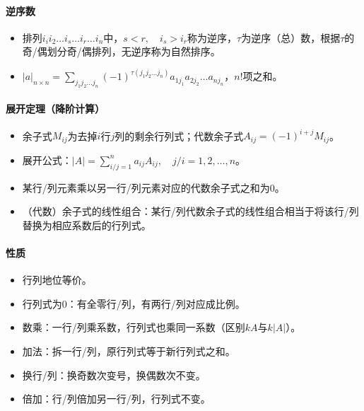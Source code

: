 \documentclass[
12pt, %
a4paper, 
oneside, %
]{scrartcl}
\begin{document}
\paragraph{逆序数}
\begin{itemize}
\item 排列$ i_i i_2 \dots i_s \dots i_r \dots i_n $中，$ s < r, \quad i_s > i_r $称为逆序，$ \tau $为逆序（总）数，根据$ \tau $的奇/偶划分奇/偶排列，无逆序称为自然排序。
\item $ |a|_{n \times n} = \sum_{j_1 j_2 \dots j_n}(-1)^{\tau(j_1 j_2 \dots j_n)} a_{1 j_{1}} a_{2 j_{2}} \dots a_{n j_{n}} $，$ n! $项之和。
\end{itemize}
\paragraph{展开定理（降阶计算）}
\begin{itemize}
\item 余子式$ M_{ij} $为去掉$ i $行$ j $列的剩余行列式；代数余子式$ A_{ij} = (-1)^{i + j} M_{ij} $。
\item 展开公式：$ |A| = \sum_{i/j = 1}^n a_{ij}A_{ij}, \quad j/i = 1, 2, \dots, n $。
\item 某行/列元素乘以另一行/列元素对应的代数余子式之和为$ 0 $。
\item （代数）余子式的线性组合：某行/列代数余子式的线性组合相当于将该行/列替换为相应系数后的行列式。
\end{itemize}
\paragraph{性质}
\begin{itemize}
\item 行列地位等价。
\item 行列式为$ 0 $：有全零行/列，有两行/列对应成比例。
\item 数乘：一行/列乘系数，行列式也乘同一系数（区别$ kA $与$ k|A| $）。
\item 加法：拆一行/列，原行列式等于新行列式之和。
\item 换行/列：换奇数次变号，换偶数次不变。
\item 倍加：行/列倍加另一行/列，行列式不变。   
\end{itemize}
\end{document}
